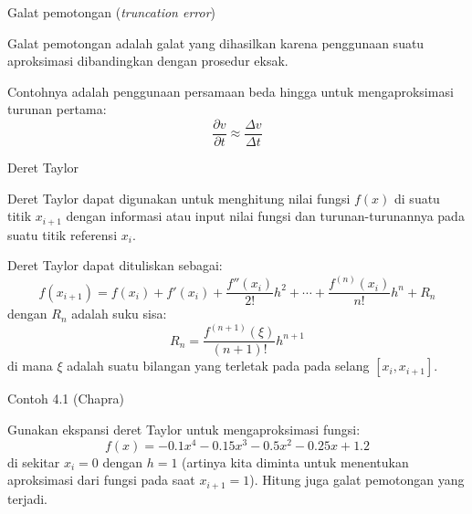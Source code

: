 \begin{frame}{Galat pemotongan (\textit{truncation error})}

Galat pemotongan adalah galat yang dihasilkan karena penggunaan
suatu aproksimasi dibandingkan dengan prosedur eksak.

Contohnya adalah penggunaan persamaan beda hingga untuk mengaproksimasi
turunan pertama:
$$
\frac{\partial v}{\partial t} \approx \frac{\Delta v}{\Delta t}
$$

\end{frame}



\begin{frame}{Deret Taylor}

Deret Taylor dapat digunakan untuk menghitung nilai
fungsi $f(x)$ di suatu titik $x_{i+1}$ dengan informasi atau input
nilai fungsi dan turunan-turunannya pada suatu titik referensi $x_{i}$.

Deret Taylor dapat dituliskan sebagai:
\begin{equation}
f(x_{i+1}) = f(x_i) + f'(x_{i}) + \frac{f''(x_i)}{2!}h^2 + \cdots +
\frac{f^{(n)}(x_i)}{n!}h^n + R_{n}
\end{equation}
dengan $R_{n}$ adalah suku sisa:
\begin{equation}
R_{n} = \frac{f^{(n+1)}(\xi)}{(n+1)!}h^{n+1}
\end{equation}
di mana $\xi$ adalah suatu bilangan yang terletak pada pada selang
$[x_i, x_{i+1}]$.

\end{frame}


\begin{frame}{Contoh 4.1 (Chapra)}

Gunakan ekspansi deret Taylor untuk mengaproksimasi fungsi:
$$
f(x) = -0.1 x^{4} - 0.15 x^{3} - 0.5 x^{2} - 0.25 x + 1.2
$$
di sekitar $x_{i} = 0$ dengan $h=1$ (artinya kita diminta untuk menentukan
aproksimasi dari fungsi pada saat $x_{i+1}=1$). Hitung juga galat pemotongan
yang terjadi.

\end{frame}


